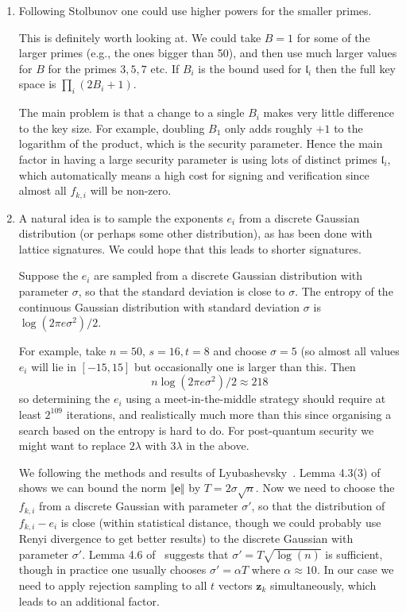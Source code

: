 \documentclass{llncs}
\renewcommand{\l}{\mathfrak{l}}
\newcommand{\e}{\mathbf{e}}
\newcommand{\z}{\mathbf{z}}
\begin{document}
\begin{enumerate}
\item Following Stolbunov one could use higher powers for the smaller primes.

This is definitely worth looking at. We could take $B=1$ for some of the larger primes (e.g., the ones bigger than 50), and then use much larger values for $B$ for the primes $3, 5, 7$ etc. If $B_i$ is the bound used for $\l_i$ then the full key space is $\prod_i (2B_i + 1)$.

The main problem is that a change to a single $B_i$ makes very little difference to the key size. For example, doubling $B_1$ only adds roughly $+1$ to the logarithm of the product, which is the security parameter.
Hence the main factor in having a large security parameter is using lots of distinct primes $\l_i$, which automatically means a high cost for signing and verification since almost all $f_{k,i}$ will be non-zero.



\item A natural idea is to sample the exponents $e_i$ from a discrete Gaussian distribution (or perhaps some other distribution), as has been done with lattice signatures. We could hope that this leads to shorter signatures.

Suppose the $e_i$ are sampled from a discrete Gaussian distribution with parameter $\sigma$, so that the standard deviation is close to $\sigma$. The entropy of the continuous Gaussian distribution with standard deviation $\sigma$ is $\log( 2 \pi e \sigma^2 )/2$.

For example, take $n=50$, $s = 16, t = 8$ and choose $\sigma = 5$ (so almost all values $e_{i}$ will lie in $[-15,15]$ but occasionally one is larger than this. Then
\[
   n \log( 2 \pi e \sigma^2 )/2 \approx 218
\]
so determining the $e_i$ using a meet-in-the-middle strategy should require at least $2^{109}$ iterations, and realistically much more than this since organising a search based on the entropy is hard to do. For post-quantum security we might want to replace $2 \lambda$ with $3\lambda$ in the above.

We following the methods and results of Lyubashevsky~\cite{Lyu12}. Lemma 4.3(3) of~\cite{Lyu12} shows we can bound the norm $\Vert \e \Vert$ by $T = 2 \sigma \sqrt{n}$.
Now we need to choose the $f_{k,i}$ from a discrete Gaussian with parameter $\sigma'$, so that the distribution of $f_{k,i} - e_i$ is close (within statistical distance, though we could probably use Renyi divergence to get better results) to the discrete Gaussian with parameter $\sigma'$.
Lemma 4.6 of~\cite{Lyu12} suggests that $\sigma' = T \sqrt{\log(n)}$ is sufficient, though in practice one usually chooses $\sigma' = \alpha T $ where $\alpha \approx 10$.
In our case we need to apply rejection sampling to all $t$ vectors $\z_k$ simultaneously,
which leads to an additional factor.


\end{enumerate}
\end{document}
